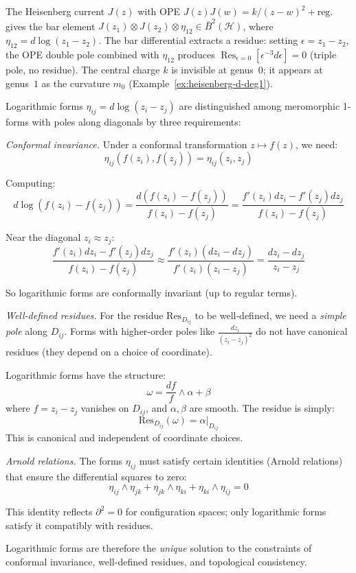 \begin{example}\label{ex:ope-to-residue}
The Heisenberg current $J(z)$ with OPE $J(z)J(w) = k/(z-w)^2 + \text{reg.}$ gives the bar element $J(z_1) \otimes J(z_2) \otimes \eta_{12} \in \bar{B}^2(\mathcal{H})$, where $\eta_{12} = d\log(z_1 - z_2)$.  The bar differential extracts a residue: setting $\epsilon = z_1 - z_2$, the OPE double pole combined with $\eta_{12}$ produces $\operatorname{Res}_{\epsilon=0}[\epsilon^{-3}d\epsilon] = 0$ (triple pole, no residue).  The central charge $k$ is invisible at genus~$0$; it appears at genus~$1$ as the curvature $m_0$ (Example~\ref{ex:heisenberg-d-deg1}).
\end{example}

\begin{remark}\label{rem:why-log-forced}
Logarithmic forms $\eta_{ij} = d\log(z_i - z_j)$ are distinguished among meromorphic 1-forms with poles along diagonals by three requirements:

\emph{Conformal invariance.} Under a conformal transformation $z \mapsto f(z)$, we need:
\[\eta_{ij}(f(z_i), f(z_j)) = \eta_{ij}(z_i, z_j)\]

Computing:
\[d\log(f(z_i) - f(z_j)) = \frac{d(f(z_i) - f(z_j))}{f(z_i) - f(z_j)} = \frac{f'(z_i)dz_i - f'(z_j)dz_j}{f(z_i) - f(z_j)}\]

Near the diagonal $z_i \approx z_j$:
\[\frac{f'(z_i)dz_i - f'(z_j)dz_j}{f(z_i) - f(z_j)} \approx \frac{f'(z_i)(dz_i - dz_j)}{f'(z_i)(z_i - z_j)} = \frac{dz_i - dz_j}{z_i - z_j}\]

So logarithmic forms are conformally invariant (up to regular terms).

\emph{Well-defined residues.} For the residue $\text{Res}_{D_{ij}}$ to be well-defined, we need a \emph{simple pole} along $D_{ij}$. Forms with higher-order poles like $\frac{dz_i}{(z_i-z_j)^2}$ do not have canonical residues (they depend on a choice of coordinate).

Logarithmic forms have the structure:
\[\omega = \frac{df}{f} \wedge \alpha + \beta\]
where $f = z_i - z_j$ vanishes on $D_{ij}$, and $\alpha, \beta$ are smooth. The residue is simply:
\[\text{Res}_{D_{ij}}(\omega) = \alpha|_{D_{ij}}\]
This is canonical and independent of coordinate choices.

\emph{Arnold relations.} The forms $\eta_{ij}$ must satisfy certain identities (Arnold relations) that ensure the differential squares to zero:
\[\eta_{ij} \wedge \eta_{jk} + \eta_{jk} \wedge \eta_{ki} + \eta_{ki} \wedge \eta_{ij} = 0\]

This identity reflects $\partial^2 = 0$ for configuration spaces; only logarithmic forms satisfy it compatibly with residues.

Logarithmic forms are therefore the \emph{unique} solution to the constraints of conformal invariance, well-defined residues, and topological consistency.
\end{remark}

